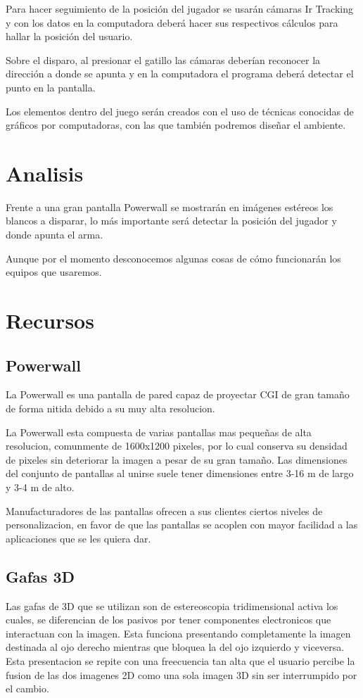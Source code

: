 \documentclass[11pt]{article} %
\begin{document}
Para hacer seguimiento de la posición del jugador se usarán cámaras Ir Tracking y con los datos en la computadora deberá hacer sus respectivos cálculos para hallar la posición del usuario.

Sobre el disparo, al presionar el gatillo las cámaras deberían reconocer la dirección a donde se apunta y en la computadora el programa deberá detectar el punto en la pantalla.

Los elementos dentro del juego serán creados con el uso de técnicas conocidas de gráficos por computadoras, con las que también podremos diseñar el ambiente.\\

\section{Analisis}
Frente a una gran pantalla Powerwall se mostrarán en imágenes estéreos los blancos a disparar, lo más importante será detectar la posición del jugador y donde apunta el arma.

Aunque por el momento desconocemos algunas cosas de cómo funcionarán los equipos que usaremos.\\

\section {Recursos}

\subsection{Powerwall}
La Powerwall es una pantalla de pared capaz de proyectar CGI de gran tamaño de forma nitida debido a su muy alta resolucion.

La Powerwall esta compuesta de varias pantallas mas pequeñas de alta resolucion, comunmente de 1600x1200 pixeles, por lo cual conserva su densidad de pixeles sin deteriorar la imagen a pesar de su gran tamaño. Las dimensiones del conjunto de pantallas al unirse suele tener dimensiones entre 3-16 m de largo y 3-4 m de alto.

Manufacturadores de las pantallas ofrecen a sus clientes ciertos niveles de personalizacion, en favor de que las pantallas se acoplen con mayor facilidad a las aplicaciones que se les quiera dar.\\

\subsection{Gafas 3D}
Las gafas de 3D que se utilizan son de estereoscopia tridimensional activa los cuales, se diferencian de los pasivos por tener componentes electronicos que interactuan con la imagen. Esta funciona presentando completamente la imagen destinada al ojo derecho mientras que bloquea la del ojo izquierdo y viceversa. Esta presentacion se repite con una freecuencia tan alta que el usuario percibe la fusion de las dos imagenes 2D como una sola imagen 3D sin ser interrumpido por el cambio.\\
\end{document}
